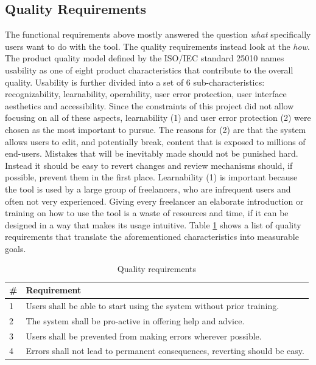 \subsection{Quality Requirements} \label{sec:quality-requirements}
The functional requirements above mostly answered the question \emph{what} specifically users want to do with the tool. The quality requirements instead look at the \emph{how}. The product quality model defined by the ISO/IEC standard 25010 \cite{_iso/iec_2011} names usability as one of eight product characteristics that contribute to the overall quality. Usability is further divided into a set of 6 sub-characteristics:  recognizability, learnability, operability, user error protection, user interface aesthetics and accessibility. Since the constraints of this project did not allow focusing on all of these aspects, learnability (1) and user error protection (2) were chosen as the most important to pursue. The reasons for (2) are that the system allows users to edit, and potentially break, content that is exposed to millions of end-users. Mistakes that will be inevitably made should not be punished hard. Instead it should be easy to revert changes and review mechanisms should, if possible, prevent them in the first place. Learnability (1) is important because the tool is used by a large group of freelancers, who are infrequent users and often not very experienced. Giving every freelancer an elaborate introduction or training on how to use the tool is a waste of resources and time, if it can be designed in a way that makes its usage intuitive. Table \ref{table:quality-requirements} shows a list of quality requirements that translate the aforementioned characteristics into measurable goals.

\begin{table}[h!]
\centering
\begin{tabular}{|l|p{12cm}|}
\hline
\rowcolor[HTML]{EFEFEF}
\textbf{\#} & \textbf{Requirement} \\ \hline
1 & Users shall be able to start using the system without prior training. \\ \hline
2 & The system shall be pro-active in offering help and advice. \\ \hline
3 & Users shall be prevented from making errors wherever possible. \\ \hline
4 & Errors shall not lead to permanent consequences, reverting should be easy. \\ \hline
\end{tabular}
\caption{Quality requirements}
\label{table:quality-requirements}
\end{table}





